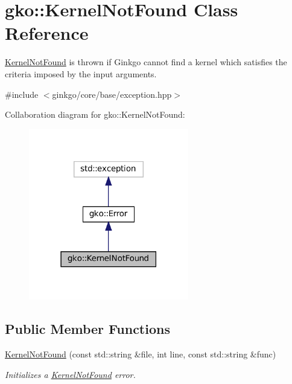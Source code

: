 \hypertarget{classgko_1_1KernelNotFound}{}\section{gko\+:\+:Kernel\+Not\+Found Class Reference}
\label{classgko_1_1KernelNotFound}


\hyperlink{classgko_1_1KernelNotFound}{Kernel\+Not\+Found} is thrown if Ginkgo cannot find a kernel which satisfies the criteria imposed by the input arguments.  




{\ttfamily \#include $<$ginkgo/core/base/exception.\+hpp$>$}



Collaboration diagram for gko\+:\+:Kernel\+Not\+Found\+:
\nopagebreak
\begin{figure}[H]
\begin{center}
\leavevmode
\includegraphics[width=198pt]{classgko_1_1KernelNotFound__coll__graph}
\end{center}
\end{figure}
\subsection*{Public Member Functions}
\begin{DoxyCompactItemize}
\item 
\hyperlink{classgko_1_1KernelNotFound_ae75eb6d7620b86c81cafeee9c38ffc47}{Kernel\+Not\+Found} (const std\+::string \&file, int line, const std\+::string \&func)
\begin{DoxyCompactList}\small\item\em Initializes a \hyperlink{classgko_1_1KernelNotFound}{Kernel\+Not\+Found} error. \end{DoxyCompactList}\end{DoxyCompactItemize}


